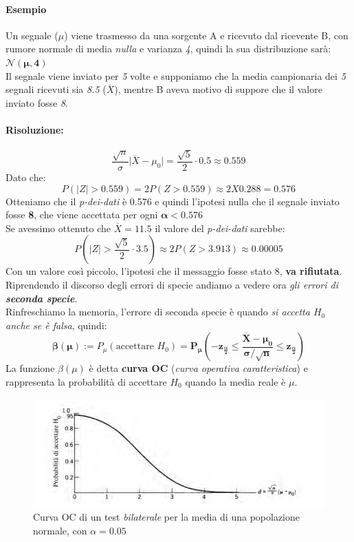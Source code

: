 \documentclass[]{article}
\begin{document}
    \paragraph{Esempio} Un segnale ($\mu$) viene trasmesso da una sorgente A e ricevuto dal ricevente B, con rumore normale  di media \textit{nulla} e varianza \textit{4}, quindi la sua distribuzione sarà: $\boldsymbol{\mathcal{N}(\mu, 4)}$ \\
    Il segnale viene inviato per \textit{5} volte e supponiamo che la media campionaria dei \textit{5} segnali ricevuti sia \textit{8.5} ($\overline{X}$), mentre B aveva motivo di suppore che il valore inviato fosse \textit{8}.
    \paragraph{Risoluzione:}
    \[ \frac{\sqrt{n}}{\sigma} \rvert \overline{X} - \mu_0 \rvert = \frac{\sqrt{5}}{2} \cdot 0.5 \approx 0.559 \]
    Dato che:
    \[ P(|Z| > 0.559) = 2P(Z > 0.559) \approx 2 X 0.288 = \boldsymbol{0.576} \]
    Otteniamo che il \textit{p-dei-dati} è 0.576 e quindi l'ipotesi nulla che il segnale inviato fosse \textbf{8}, che viene accettata per ogni $\boldsymbol{\alpha < 0.576}$ \\
    Se avessimo ottenuto che $\overline{X} = 11.5$ il valore del \textit{p-dei-dati} sarebbe:
    \[ P \left( |Z| > \frac{\sqrt{5}}{2} \cdot 3.5 \right) \approx 2P(Z > 3.913) \approx 0.00005 \]
    Con un valore così piccolo, l'ipotesi che il messaggio fosse stato 8, \textbf{va rifiutata}. \\[3ex]
    Riprendendo il discorso degli errori di specie andiamo a vedere ora \textit{gli errori di \textbf{seconda specie}}. \\
    Rinfreschiamo la memoria, l'errore di seconda specie è quando \textit{si accetta $H_0$ anche se è falsa}, quindi:
    \[ \boldsymbol{\beta(\mu)} := P_\mu (\text{accettare } H_0) = \boldsymbol{P_\mu \left( -z_{\frac{\alpha}{2}} \leq \frac{\overline{X} - \mu_0}{\sigma / \sqrt{n}} \leq z_{\frac{\alpha}{2}}\right)}\]
    La funzione $\beta(\mu)$ è detta \textbf{curva OC} (\textit{curva operativa caratteristica}) e rappresenta la probabilità di accettare $H_0$ quando la media reale è $\mu$.
    \begin{figure}[H]
        \includegraphics[width=\textwidth]{images/boh_6.png}
        \caption{Curva OC di un test \textit{bilaterale} per la media di una popolazione normale, con $\alpha = 0.05$}
    \end{figure}
\end{document}

